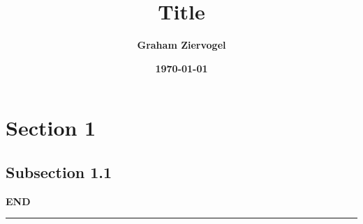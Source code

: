 \documentclass[a4paper]{article}
\title{\bf{Title}}
\author{\bf{Graham Ziervogel}}
\date{\bf{\today}}
\begin{document}
\maketitle

\newpage

\section{Section 1}

\subsection*{Subsection 1.1}

\newpage

\begin{center}
\bf{END} \\
\end{center}
\vspace{0.5cm}
\hrule
\end{document}
